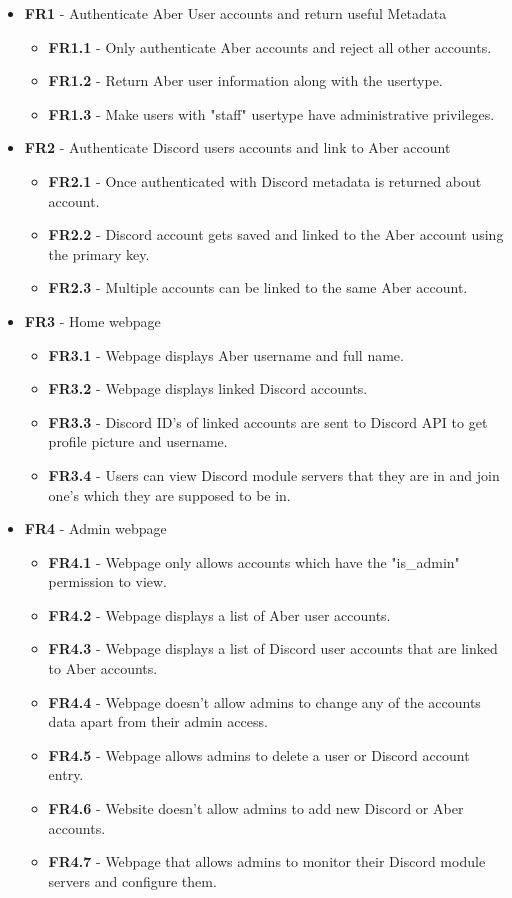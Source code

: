 \begin{itemize}
	\item \textbf{FR1} - Authenticate Aber User accounts and return useful Metadata
	\begin{itemize}
		\item \textbf{FR1.1} - Only authenticate Aber accounts and reject all other accounts.
		\item \textbf{FR1.2} - Return Aber user information along with the usertype.
		\item \textbf{FR1.3} - Make users with "staff" usertype have administrative privileges.
	\end{itemize}

	\item \textbf{FR2} - Authenticate Discord users accounts and link to Aber account
	\begin{itemize}
		\item \textbf{FR2.1} - Once authenticated with Discord metadata is returned about account.
		\item \textbf{FR2.2} - Discord account gets saved and linked to the Aber account using the primary key.
		\item \textbf{FR2.3} - Multiple accounts can be linked to the same Aber account.
	\end{itemize}

	\item \textbf{FR3} - Home webpage
	\begin{itemize}
		\item \textbf{FR3.1} - Webpage displays Aber username and full name.
		\item \textbf{FR3.2} - Webpage displays linked Discord accounts.
		\item \textbf{FR3.3} - Discord ID's of linked accounts are sent to Discord API to get profile picture and username.
		\item \textbf{FR3.4} - Users can view Discord module servers that they are in and join one's which they are supposed to be in.
	\end{itemize}

	\item \textbf{FR4} - Admin webpage
	\begin{itemize}
		\item \textbf{FR4.1} - Webpage only allows accounts which have the "is\_admin" permission to view.
		\item \textbf{FR4.2} - Webpage displays a list of Aber user accounts.
		\item \textbf{FR4.3} - Webpage displays a list of Discord user accounts that are linked to Aber accounts.
		\item \textbf{FR4.4} - Webpage doesn't allow admins to change any of the accounts data apart from their admin access.
		\item \textbf{FR4.5} - Webpage allows admins to delete a user or Discord account entry.
		\item \textbf{FR4.6} - Website doesn't allow admins to add new Discord or Aber accounts.
		\item \textbf{FR4.7} - Webpage that allows admins to monitor their Discord module servers and configure them.
	\end{itemize}


\end{itemize}
